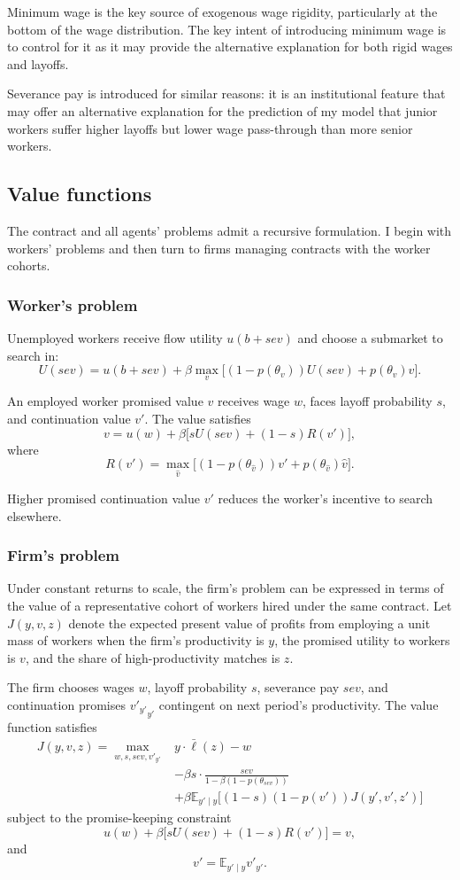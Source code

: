 Minimum wage is the key source of exogenous wage rigidity, particularly at the bottom of the wage distribution.  The key intent of introducing minimum wage is to control for it as it may provide the alternative explanation for both rigid wages and layoffs. 

Severance pay is introduced for similar reasons: it is an institutional feature that may offer an alternative explanation for the prediction of my model that junior workers suffer higher layoffs but lower wage pass-through than more senior workers. 

\subsection{Value functions}
The contract and all agents’ problems admit a recursive formulation. I begin with workers’ problems and then turn to firms managing contracts with the worker cohorts.

\subsubsection*{Worker’s problem}

Unemployed workers receive flow utility $u(b+sev)$ and choose a submarket to search in:
\[
U(sev) = u(b+sev) + \beta \max_v \big[(1-p(\theta_v))U(sev) + p(\theta_v)v\big].
\]

An employed worker promised value $v$ receives wage $w$, faces layoff probability $s$, and continuation value $v'$. The value satisfies
\[
v = u(w) + \beta \big[sU(sev) + (1-s)R(v')\big],
\]
where
\[
R(v') = \max_{\hat{v}} \big[(1-p(\theta_{\hat{v}}))v' + p(\theta_{\hat{v}})\hat{v}\big].
\]

Higher promised continuation value $v'$ reduces the worker’s incentive to search elsewhere.

\subsubsection*{Firm’s problem}

Under constant returns to scale, the firm’s problem can be expressed in terms of the value of a representative cohort of workers hired under the same contract. Let $J(y,v,z)$ denote the expected present value of profits from employing a unit mass of workers when the firm’s productivity is $y$, the promised utility to workers is $v$, and the share of high-productivity matches is $z$.

The firm chooses wages $w$, layoff probability $s$, severance pay $sev$, and continuation promises ${v'_{y'}}_{y'}$ contingent on next period’s productivity. The value function satisfies
\[
\begin{aligned}
J(y,v,z) = \max_{w,s,sev,{v'_{y'}}} &
y \cdot \bar{\ell}(z) - w \\
&- \beta s \cdot \frac{sev}{1-\beta(1-p(\theta_{sev}))} \\
&+ \beta \mathbb{E}_{y' \mid y} \Big[(1-s)(1-p(v')) J(y',v',z') \Big]
\end{aligned}
\]
subject to the promise-keeping constraint
\[
u(w) + \beta \big[s U(sev) + (1-s)R(v') \big] = v,
\]
and
\[
v' = \mathbb{E}_{y'\mid y} v'_{y'}.
\]

